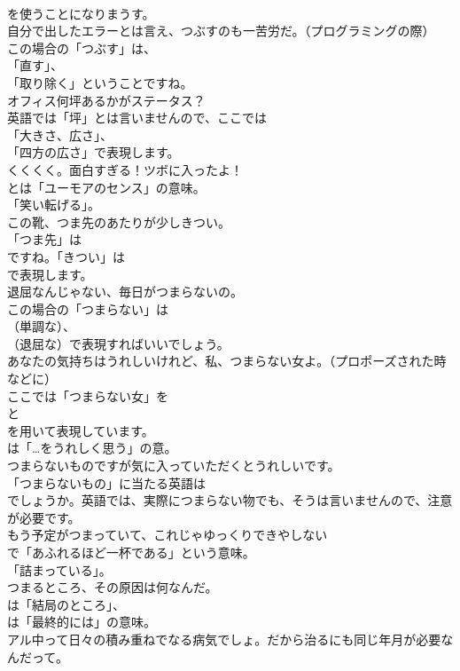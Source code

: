 \documentclass[8pt]{extreport}
\begin{document}
\begin{CJK}{UTF8}{min}
\\	を使うことになりまうす。	
\\	自分で出したエラーとは言え、つぶすのも一苦労だ。（プログラミングの際） 
\\	この場合の「つぶす」は、
\\	「直す」、
\\	「取り除く」ということですね。	
\\	オフィス何坪あるかがステータス？ 
\\	英語では「坪」とは言いませんので、ここでは
\\	「大きさ、広さ」、
\\	「四方の広さ」で表現します。	
\\	くくくく。面白すぎる！ツボに入ったよ！ 
\\	とは「ユーモアのセンス」の意味。
\\	「笑い転げる」。	
\\	この靴、つま先のあたりが少しきつい。 
\\	「つま先」は 
\\	ですね。「きつい」は 
\\	で表現します。	
\\	退屈なんじゃない、毎日がつまらないの。 
\\	この場合の「つまらない」は 
\\	（単調な）、
\\	（退屈な）で表現すればいいでしょう。	
\\	あなたの気持ちはうれしいけれど、私、つまらない女よ。（プロポーズされた時などに） 
\\	ここでは「つまらない女」を
\\	と
\\	を用いて表現しています。
\\	は「…をうれしく思う」の意。	
\\	つまらないものですが気に入っていただくとうれしいです。 
\\	「つまらないもの」に当たる英語は
\\	でしょうか。英語では、実際につまらない物でも、そうは言いませんので、注意が必要です。	
\\	もう予定がつまっていて、これじゃゆっくりできやしない 
\\	で「あふれるほど一杯である」という意味。
\\	「詰まっている」。	
\\	つまるところ、その原因は何なんだ。 
\\	は「結局のところ」、
\\	は「最終的には」の意味。	
\\	アル中って日々の積み重ねでなる病気でしょ。だから治るにも同じ年月が必要なんだって。 

\end{CJK}
\end{document}
